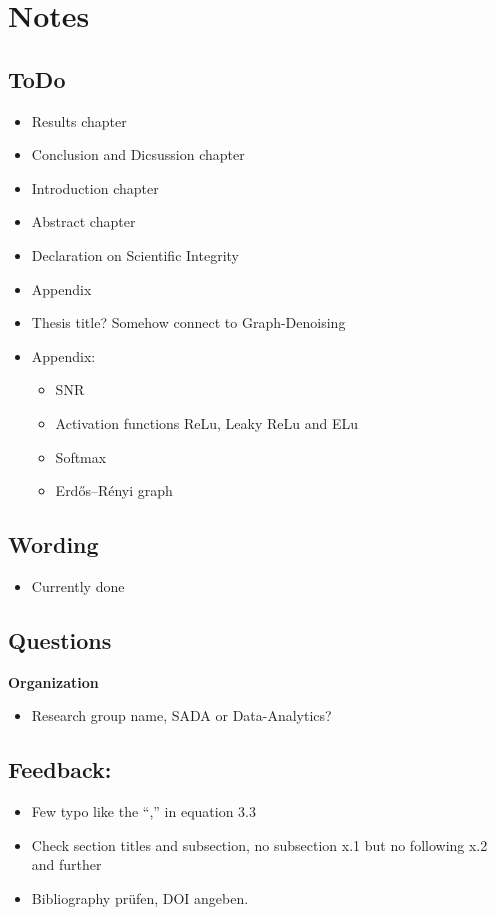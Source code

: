 \chapter{Notes}

\section{ToDo}
\begin{itemize}
    \item Results chapter
    \item Conclusion and Dicsussion chapter
    \item Introduction chapter
    \item Abstract chapter
    \item Declaration on Scientific Integrity
    \item Appendix
    \item Thesis title? Somehow connect to Graph-Denoising
    \item Appendix:
    \begin{itemize}
        \item SNR
        \item Activation functions ReLu,  Leaky ReLu and ELu
        \item Softmax
        \item Erdős–Rényi graph
    \end{itemize}
\end{itemize}

\section{Wording}
\begin{itemize}
    \item Currently done
\end{itemize}

\section{Questions}
\textbf{Organization}
\begin{itemize}
    \item Research group name, SADA or Data-Analytics?
\end{itemize}


\section{Feedback:}
\begin{itemize}
    \item Few typo like the “,” in equation 3.3
    \item Check section titles and subsection, no subsection x.1 but no following x.2 and further
    \item Bibliography prüfen, DOI angeben.
\end{itemize}


\clearpage

